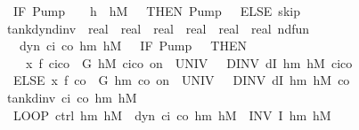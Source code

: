 \documentclass[envcountsame,envcountsect]{llncs}
\begin{document}
\begin{example}
\begin{isabellebody}
\ \ {\isacharparenleft}IF\ {\isacharparenleft}Pump\ {\isacharequal}\ {}\ {\isasymand}\ h\ {\isasymge}\ h\isactrlsub M\ {\isacharminus}\ {}{\isacharparenright}\ THEN\ {\isacharparenleft}Pump\ {\isacharcolon}{\isacharcolon}{\isacharequal}\ {}{\isacharparenright}\ ELSE\ skip{\isacharparenright}{\isacharparenright}{\isachardoublequoteclose}\isanewline
\isanewline
{}\isamarkupfalse%
\ tank{\isacharunderscore}dyn{\isacharunderscore}dinv\ {\isacharcolon}{\isacharcolon}\ {\isachardoublequoteopen}real\ {\isasymRightarrow}\ real\ {\isasymRightarrow}\ real\ {\isasymRightarrow}\ real\ {\isasymRightarrow}\ real\ {\isasymRightarrow}\ {\isacharparenleft}real{\isacharcircum}{}{\isacharparenright}\ nd{\isacharunderscore}fun{\isachardoublequoteclose}\isanewline
\ \ \ {\isachardoublequoteopen}dyn\ c\isactrlsub i\ c\isactrlsub o\ h\isactrlsub m\ h\isactrlsub M\ {\isasymtau}\ {\isasymequiv}\ {\isacharparenleft}IF\ {\isacharparenleft}Pump\ {\isacharequal}\ {}{\isacharparenright}\ THEN\ \isanewline
\ \ \ \ {\isacharparenleft}x{\isasymacute}{\isacharequal}\ f\ {\isacharparenleft}c\isactrlsub i{\isacharminus}c\isactrlsub o{\isacharparenright}\ {\isacharampersand}\ G\ h\isactrlsub M\ {\isacharparenleft}c\isactrlsub i{\isacharminus}c\isactrlsub o{\isacharparenright}\ on\ {\isacharbraceleft}{}{\isachardot}{\isachardot}{\isasymtau}{\isacharbraceright}\ UNIV\ {\isacharat}\ {}\ DINV\ {\isacharparenleft}dI\ h\isactrlsub m\ h\isactrlsub M\ {\isacharparenleft}c\isactrlsub i{\isacharminus}c\isactrlsub o{\isacharparenright}{\isacharparenright}{\isacharparenright}\isanewline
\ \ ELSE\ {\isacharparenleft}x{\isasymacute}{\isacharequal}\ f\ {\isacharparenleft}{\isacharminus}c\isactrlsub o{\isacharparenright}\ {\isacharampersand}\ G\ h\isactrlsub m\ {\isacharparenleft}{\isacharminus}c\isactrlsub o{\isacharparenright}\ on\ {\isacharbraceleft}{}{\isachardot}{\isachardot}{\isasymtau}{\isacharbraceright}\ UNIV\ {\isacharat}\ {}\ DINV\ {\isacharparenleft}dI\ h\isactrlsub m\ h\isactrlsub M\ {\isacharparenleft}{\isacharminus}c\isactrlsub o{\isacharparenright}{\isacharparenright}{\isacharparenright}{\isacharparenright}{\isachardoublequoteclose}\isanewline
\isanewline
{}\isamarkupfalse%
\ {\isachardoublequoteopen}tank{\isacharunderscore}dinv\ c\isactrlsub i\ c\isactrlsub o\ h\isactrlsub m\ h\isactrlsub M\ {\isasymtau}\ {\isasymequiv}\isanewline 
\ \ LOOP\ {\isacharparenleft}ctrl\ h\isactrlsub m\ h\isactrlsub M\ {\isacharsemicolon}\ dyn\ c\isactrlsub i\ c\isactrlsub o\ h\isactrlsub m\ h\isactrlsub M\ {\isasymtau}{\isacharparenright}\ INV\ {\isacharparenleft}I\ h\isactrlsub m\ h\isactrlsub M{\isacharparenright}{\isachardoublequoteclose}\isanewline

\end{isabellebody}
\end{example}
\end{document}
